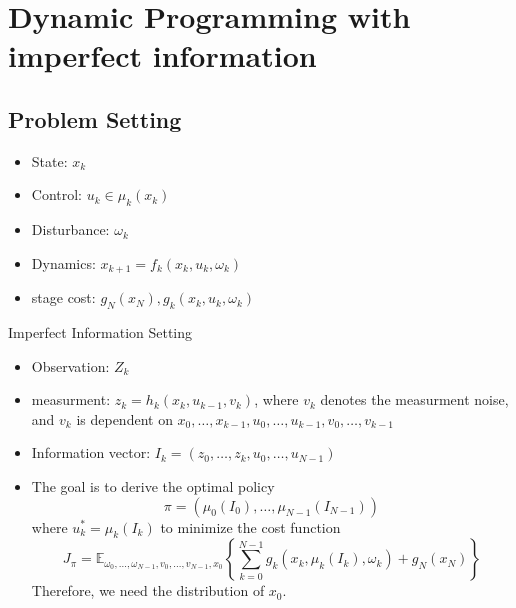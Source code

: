 \chapter{Dynamic Programming with imperfect information}
\section{Problem Setting}
\begin{itemize}
\item
State: $x_k$
\item
Control: $u_k\in\mu_k(x_k)$
\item
Disturbance: $\omega_k$
\item
Dynamics: $x_{k+1} = f_k(x_k,u_k,\omega_k)$
\item
stage cost: $g_N(x_N),g_k(x_k,u_k,\omega_k)$
\end{itemize}
Imperfect Information Setting
\begin{itemize}
\item
Observation: $Z_k$
\item
measurment: $z_k = h_k(x_k,u_{k-1},v_k)$, where $v_k$ denotes the measurment noise, and $v_k$ is dependent on $x_0,\dots,x_{k-1},u_0,\dots,u_{k-1},v_0,\dots,v_{k-1}$
\item
Information vector: $I_k = (z_0,\dots,z_k,u_0,\dots,u_{N-1})$
\item
The goal is to derive the optimal policy
\[
\pi = (\mu_0(I_{0}),\dots,\mu_{N-1}(I_{N-1}))
\]
where $u_k^* = \mu_k(I_k)$ to minimize the cost function
\[
J_\pi = \mathbb{E}_{\omega_0,\dots,\omega_{N-1},v_0,\dots,v_{N-1},x_0}\left\{\sum_{k=0}^{N-1}g_k(x_k,\mu_k(I_k),\omega_k)+g_N(x_N)\right\}
\]
Therefore, we need the distribution of $x_0$.
\end{itemize}

